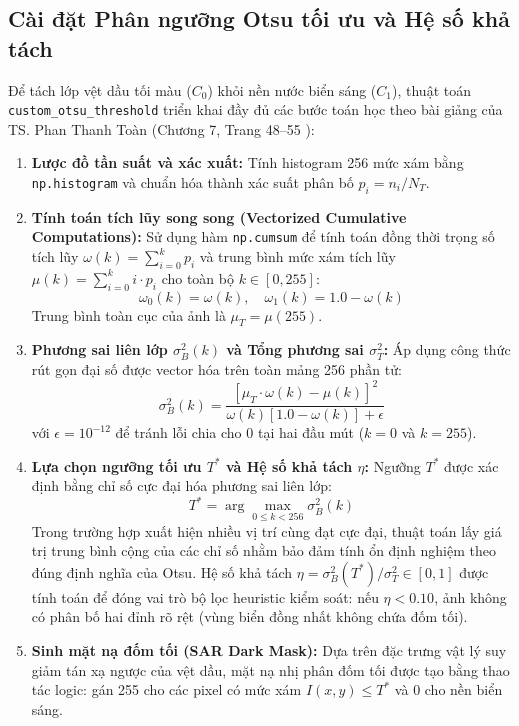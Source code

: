 \subsection{Cài đặt Phân ngưỡng Otsu tối ưu và Hệ số khả tách}
\label{subsec:custom_otsu_threshold}
Để tách lớp vệt dầu tối màu ($C_0$) khỏi nền nước biển sáng ($C_1$), thuật toán \texttt{custom\_otsu\_threshold} triển khai đầy đủ các bước toán học theo bài giảng của TS. Phan Thanh Toàn (Chương 7, Trang 48--55 \cite{toan2024xla}):

\begin{enumerate}
    \item \textbf{Lược đồ tần suất và xác xuất:} Tính histogram 256 mức xám bằng \texttt{np.histogram} và chuẩn hóa thành xác suất phân bố $p_i = n_i / N_T$.
    \item \textbf{Tính toán tích lũy song song (Vectorized Cumulative Computations):} Sử dụng hàm \texttt{np.cumsum} để tính toán đồng thời trọng số tích lũy $\omega(k) = \sum_{i=0}^k p_i$ và trung bình mức xám tích lũy $\mu(k) = \sum_{i=0}^k i \cdot p_i$ cho toàn bộ $k \in [0, 255]$:
    \begin{equation}
        \omega_0(k) = \omega(k), \quad \omega_1(k) = 1.0 - \omega(k)
    \end{equation}
    Trung bình toàn cục của ảnh là $\mu_T = \mu(255)$.
    \item \textbf{Phương sai liên lớp $\sigma_B^2(k)$ và Tổng phương sai $\sigma_T^2$:}
    Áp dụng công thức rút gọn đại số được vector hóa trên toàn mảng 256 phần tử:
    \begin{equation}
        \sigma_B^2(k) = \frac{[\mu_T \cdot \omega(k) - \mu(k)]^2}{\omega(k)[1.0 - \omega(k)] + \epsilon}
    \end{equation}
    với $\epsilon = 10^{-12}$ để tránh lỗi chia cho 0 tại hai đầu mút ($k=0$ và $k=255$).
    \item \textbf{Lựa chọn ngưỡng tối ưu $T^*$ và Hệ số khả tách $\eta$:}
    Ngưỡng $T^*$ được xác định bằng chỉ số cực đại hóa phương sai liên lớp:
    \begin{equation}
        T^* = \arg\max_{0 \le k < 256} \sigma_B^2(k)
    \end{equation}
    Trong trường hợp xuất hiện nhiều vị trí cùng đạt cực đại, thuật toán lấy giá trị trung bình cộng của các chỉ số nhằm bảo đảm tính ổn định nghiệm theo đúng định nghĩa của Otsu. Hệ số khả tách $\eta = \sigma_B^2(T^*) / \sigma_T^2 \in [0, 1]$ được tính toán để đóng vai trò bộ lọc heuristic kiểm soát: nếu $\eta < 0.10$, ảnh không có phân bố hai đỉnh rõ rệt (vùng biển đồng nhất không chứa đốm tối).
    \item \textbf{Sinh mặt nạ đốm tối (SAR Dark Mask):}
    Dựa trên đặc trưng vật lý suy giảm tán xạ ngược của vệt dầu, mặt nạ nhị phân đốm tối được tạo bằng thao tác logic: gán 255 cho các pixel có mức xám $I(x, y) \le T^*$ và 0 cho nền biển sáng.
\end{enumerate}

